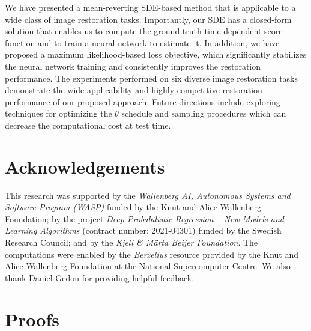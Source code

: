 \documentclass{article}
\theoremstyle{plain}
\theoremstyle{definition}
\theoremstyle{remark}
\begin{document}
We have presented a mean-reverting SDE-based method that is applicable to a wide class of image restoration tasks. Importantly, our SDE has a closed-form solution that enables us to compute the ground truth time-dependent score function and to train a neural network to estimate it. In addition, we have proposed a maximum likelihood-based loss objective, which significantly stabilizes the neural network training and consistently improves the restoration performance. The experiments performed on six diverse image restoration tasks demonstrate the wide applicability and highly competitive restoration performance of our proposed approach. Future directions include exploring techniques for optimizing the $\theta$ schedule and sampling procedures which can decrease the computational cost at test time.
 




\section*{Acknowledgements}
This research was supported by the \emph{Wallenberg AI, Autonomous Systems and Software Program (WASP)} funded by the Knut and Alice Wallenberg Foundation; 
by the project \emph{Deep Probabilistic Regression -- New Models and Learning Algorithms} (contract number: 2021-04301) funded by the Swedish Research Council; and by the 
\emph{Kjell \& M{\"a}rta Beijer Foundation}.
The computations were enabled by the \textit{Berzelius} resource provided by the Knut and Alice Wallenberg Foundation at the National Supercomputer Centre. We also thank Daniel Gedon for providing helpful feedback.


















\newpage
\appendix
\onecolumn











\section{Proofs}
\end{document}
